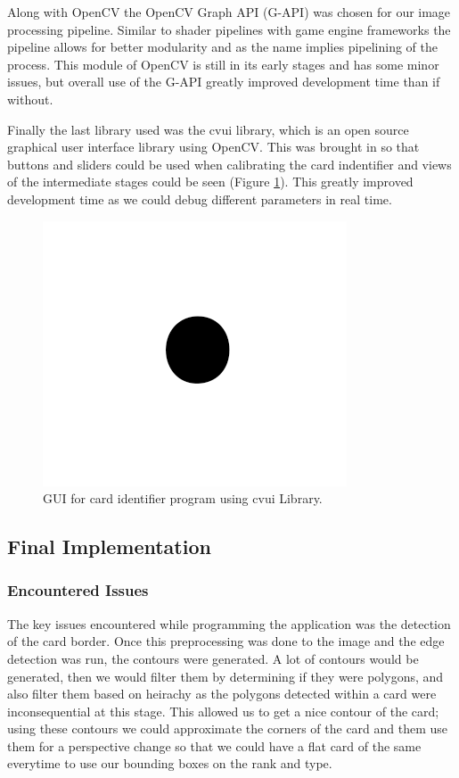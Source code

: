 \documentclass[conference]{IEEEtran}
\begin{document}
Along with OpenCV the OpenCV Graph API (G-API) was chosen for our image processing pipeline. Similar
to shader pipelines with game engine frameworks the pipeline allows for better modularity and as the
name implies pipelining of the process. This module of OpenCV is still in its early stages and has
some minor issues, but overall use of the G-API greatly improved development time than if without.

Finally the last library used was the cvui library, which is an open source graphical user interface
library using OpenCV. This was brought in so that buttons and sliders could be used when calibrating
the card indentifier and views of the intermediate stages could be seen (Figure \ref{fig:gui}). This
greatly improved development time as we could debug different parameters in real time.

\begin{figure}[htbp]
\centerline{\includegraphics{fig1.png}}
\caption{GUI for card identifier program using cvui Library.}
\label{fig:gui}
\end{figure}


\subsection{Final Implementation}
\subsubsection{Encountered Issues}
The key issues encountered while programming the application was the detection of the card border.
Once this preprocessing was done to the image and the edge detection was run, the contours were
generated. A lot of contours would be generated, then we would filter them by determining if they
were polygons, and also filter them based on heirachy as the polygons detected within a card were
inconsequential at this stage. This allowed us to get a nice contour of the card; using these
contours we could approximate the corners of the card and them use them for a perspective change so
that we could have a flat card of the same everytime to use our bounding boxes on the rank and type.
\end{document}
